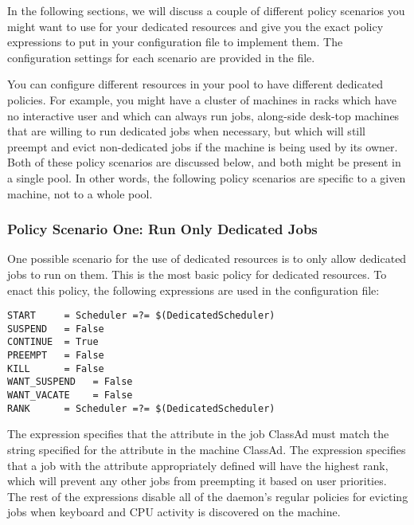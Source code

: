 In the following sections, we will discuss a couple of different
policy scenarios you might want to use for your dedicated resources
and give you the exact policy expressions to put in your configuration
file to implement them.
The configuration settings for each scenario are provided in the
 file.

\Note You can configure different resources in your pool to have
different dedicated policies.
For example, you might have a cluster of machines in racks which have
no interactive user and which can always run jobs, along-side desk-top
machines that are willing to run dedicated jobs when necessary, but
which will still preempt and evict non-dedicated jobs if the machine
is being used by its owner.  
Both of these policy scenarios are discussed below, and both might be
present in a single pool.
In other words, the following policy scenarios are specific to a given
machine, not to a whole pool.


\subsubsection{\label{sec:Configure-Dedicated-Only-Policy}
Policy Scenario One: Run Only Dedicated Jobs}

One possible scenario for the use of dedicated resources
is to only allow dedicated jobs to run on them.  
This is the most basic policy for dedicated resources.
To enact this policy, the following expressions are used in
the configuration file:

\begin{verbatim}
START     = Scheduler =?= $(DedicatedScheduler)
SUSPEND   = False
CONTINUE  = True
PREEMPT   = False
KILL      = False
WANT_SUSPEND   = False
WANT_VACATE    = False
RANK      = Scheduler =?= $(DedicatedScheduler)
\end{verbatim}

The  expression specifies that the 
attribute in the job ClassAd must match the string specified for
the  attribute in the machine ClassAd.
The  expression specifies that a job with the
 attribute appropriately defined will have the highest
rank, which will prevent any other jobs from preempting it based on
user priorities.
The rest of the expressions disable all of the  daemon's
regular policies for evicting jobs when keyboard and CPU activity is
discovered on the machine.


